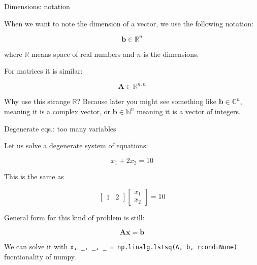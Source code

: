 \documentclass{beamer}
\begin{document}
\begin{frame}{Dimensions: notation}
	\begin{flushleft}
		
		When we want to note the dimension of a vector, we use the following notation:
		
		\begin{equation}
			\mathbf{b} \in \mathbb{R}^n
		\end{equation}
		
		where $\mathbb{R}$ means space of real numbers and $n$ is the dimensions.
		
		\bigskip
		
		For matrices it is similar:
		
		\begin{equation}
			\mathbf{A} \in \mathbb{R}^{n, n}
		\end{equation}
		
		Why use this strange $\mathbb{R}$? Because later you might see something like $\mathbf{b} \in \mathbb{C}^n$, meaning it is a complex vector, or $\mathbf{b} \in \mathbb{N}^n$ meaning it is a vector of integers. 
		
	\end{flushleft}
\end{frame}




\begin{frame}{Degenerate eqs.: too many variables}
	\begin{flushleft}
	
Let us solve a degenerate system of equations:

\begin{equation}
	x_1   + 2 x_2 = 10
\end{equation}

This is the same as

\begin{equation}
	\begin{bmatrix}
		1   & 2
	\end{bmatrix}
	\begin{bmatrix}
		x_1  \\
		x_2 
	\end{bmatrix}
	=
	10
\end{equation}

General form for this kind of problem is still:

\begin{equation}
	\mathbf{A} \mathbf{x} = \mathbf{b}
\end{equation}

We can solve it with \texttt{x, \_, \_, \_ = np.linalg.lstsq(A, b, rcond=None)} fucntionality of numpy. 		
		
	\end{flushleft}
\end{frame}
\end{document}
